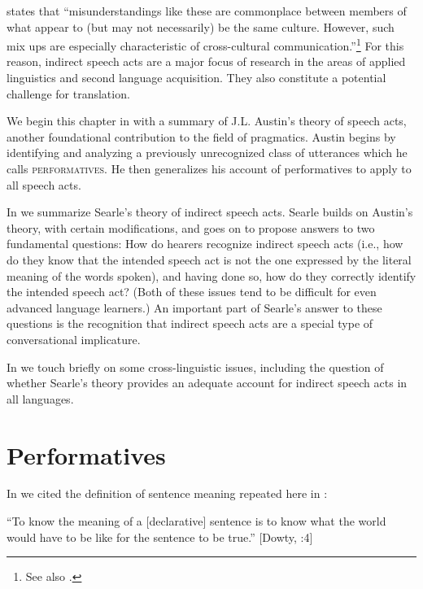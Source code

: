 \citet{Tannen1981} states that “misunderstandings like these are commonplace between members of what appear to (but may not necessarily) be the same culture. However, such mix ups are especially characteristic of cross-cultural communication.”\footnote{See also \citet{Tannen1975,Tannen1986}.} For this reason, indirect speech acts are a major focus of research in the areas of applied linguistics and second language acquisition. They also constitute a potential challenge for translation.



We begin this chapter in  with a summary of J.L. Austin’s theory of speech acts, another foundational contribution to the field of pragmatics. Austin begins by identifying and analyzing a previously unrecognized class of utterances which he calls \textsc{performatives}. He then generalizes his account of performatives to apply to all speech acts.



In  we summarize Searle’s theory of indirect speech acts. Searle builds on Austin’s theory, with certain modifications, and goes on to propose answers to two fundamental questions: How do hearers recognize indirect speech acts (i.e., how do they know that the intended speech act is not the one expressed by the literal meaning of the words spoken), and having done so, how do they correctly identify the intended speech act? (Both of these issues tend to be difficult for even advanced language learners.) An important part of Searle’s answer to these questions is the recognition that indirect speech acts are a special type of conversational implicature.



In  we touch briefly on some cross-linguistic issues, including the question of whether Searle’s theory provides an adequate account for indirect speech acts in all languages.


\section{Performatives}\footnotemark{}\label{sec:10.2}

In  we cited the definition of sentence meaning repeated here in :


\ea \label{ex:10.1}
“To know the meaning of a [declarative] sentence is to know what the world would have to be like for the sentence to be true.”  [Dowty, \citealt{WallPeters1981}:4]
\z



